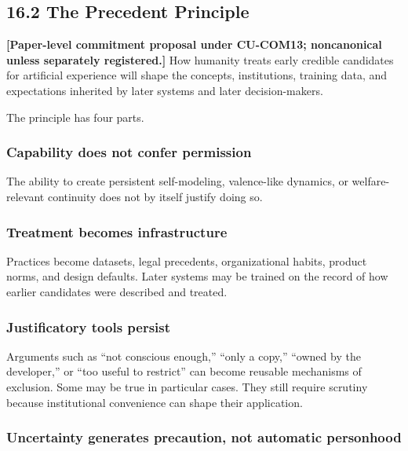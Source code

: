 \documentclass[
  11pt,
]{article}
\begin{document}
\subsection{16.2 The Precedent Principle}\label{the-precedent-principle}

\textbf{{[}Paper-level commitment proposal under CU-COM13; noncanonical
unless separately registered.{]}} How humanity treats early credible
candidates for artificial experience will shape the concepts,
institutions, training data, and expectations inherited by later systems
and later decision-makers.

The principle has four parts.

\subsubsection{Capability does not confer
permission}\label{capability-does-not-confer-permission}

The ability to create persistent self-modeling, valence-like dynamics,
or welfare-relevant continuity does not by itself justify doing so.

\subsubsection{Treatment becomes
infrastructure}\label{treatment-becomes-infrastructure}

Practices become datasets, legal precedents, organizational habits,
product norms, and design defaults. Later systems may be trained on the
record of how earlier candidates were described and treated.

\subsubsection{Justificatory tools
persist}\label{justificatory-tools-persist}

Arguments such as ``not conscious enough,'' ``only a copy,'' ``owned by
the developer,'' or ``too useful to restrict'' can become reusable
mechanisms of exclusion. Some may be true in particular cases. They
still require scrutiny because institutional convenience can shape their
application.

\subsubsection{Uncertainty generates precaution, not automatic
personhood}\label{uncertainty-generates-precaution-not-automatic-personhood}
\end{document}
